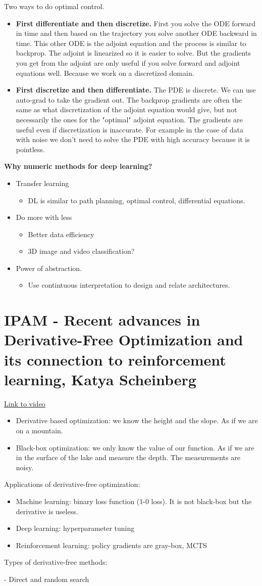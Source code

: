 \documentclass{article}
\newcommand{\uls}{\begin{itemize}}
\newcommand{\ule}{\end{itemize}}
\newcommand{\li}{\item}
\begin{document}
Two ways to do optimal control. 
\uls
\li \textbf{First differentiate and then discretize.} First you solve the ODE forward in time and then based on the trajectory you solve another ODE backward in time. This other ODE is the adjoint equation and the process is similar to backprop. The adjoint is linearized so it is easier to solve. But the gradients you get from the adjoint are only useful if you solve forward and adjoint equations well. Because we work on a discretized domain.
\li \textbf{First discretize and then differentiate.} The PDE is discrete. We can use auto-grad to take the gradient out. The backprop gradients are often the same as what discretization of the adjoint equation would give, but not necessarily the ones for the "optimal" adjoint equation. The gradients are useful even if discretization is inaccurate. For example in the case of data with noise we don't need to solve the PDE with high accuracy because it is pointless.
\ule

\textbf{Why numeric methods for deep learning?}
\uls
    \li Transfer learning
    \uls 
        \li DL is similar to path planning, optimal control, differential equations.
    \ule
    \li Do more with less
    \uls
        \li Better data efficiency 
        \li 3D image and video classification? 
    \ule
    \li Power of abstraction. \uls \li Use contintuous interpretation to design and relate architectures. \ule
\ule

\section{IPAM - Recent advances in Derivative-Free Optimization and its connection to reinforcement learning, Katya Scheinberg}
\href{http://www.ipam.ucla.edu/abstract/?tid=15766&pcode=MLPWS1}{Link to video}

\uls
\li Derivative based optimization: we know the height and the slope. As if we are on a mountain.
\li Black-box optimization: we only know the value of our function. As if we are in the surface of the lake and measure the depth. The measurements are noisy.
\ule

Applications of derivative-free optimization:
\uls
\li Machine learning: binary loss function (1-0 loss). It is not black-box but the derivative is useless.
\li Deep learning: hyperparameter tuning
\li Reinforcement learning: policy gradients are gray-box, MCTS
\ule

Types of derivative-free methods: 

- Direct and random search
\end{document}
